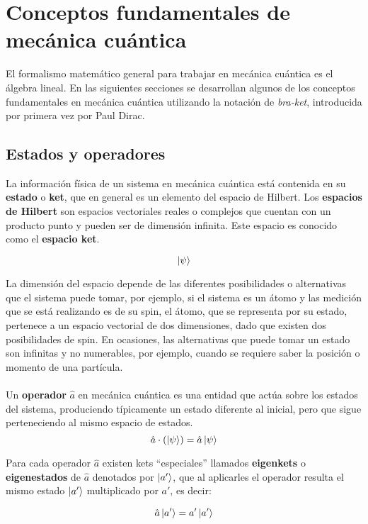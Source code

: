 \chapter{Conceptos fundamentales de mecánica cuántica}\label{ch:2}

El formalismo matemático general para trabajar en  mecánica cuántica es el álgebra lineal. En las siguientes secciones se desarrollan algunos de los conceptos fundamentales en mecánica cuántica utilizando la notación de \emph{bra-ket}, introducida por primera vez por Paul Dirac.

\section{Estados y operadores}\label{sec:Estados y Operadores}
La información física de un sistema en mecánica cuántica está contenida en su \textbf{estado} o \textbf{ket}, que en general es un elemento del espacio de Hilbert. Los \textbf{espacios de Hilbert} son espacios vectoriales reales o complejos que cuentan con un producto punto y pueden ser de dimensión infinita. Este espacio es conocido como el \textbf{espacio ket}.

\[
\ket{\psi}
\]

La dimensión del espacio depende de las diferentes posibilidades o alternativas que el sistema puede tomar, por ejemplo, si el sistema es un átomo y las medición que se está realizando es de su spin, el átomo, que se representa por su estado, pertenece a un espacio vectorial de dos dimensiones, dado que existen dos posibilidades de spin. En ocasiones, las alternativas que puede tomar un estado son infinitas y no numerables, por ejemplo, cuando se requiere saber la posición o momento de una partícula.
\\
\\
Un \textbf{operador} $\hat{a}$ en mecánica cuántica es una entidad que actúa sobre los estados del sistema, produciendo típicamente un estado diferente al inicial, pero que sigue perteneciendo al mismo espacio de estados.
\[
\hat{a} \cdot (\ket{\psi}) = \hat{a}\ket{\psi}
\]

Para cada operador $\hat{a}$ existen kets ``especiales'' llamados \textbf{eigenkets} o \textbf{eigenestados} de $\hat{a}$ denotados por $\ket{a'}$, que al aplicarles el operador resulta el mismo estado $\ket{a'}$ multiplicado por $a'$, es decir:

\[ \hat{a}\ket{a'} = a'\ket{a'}\]

